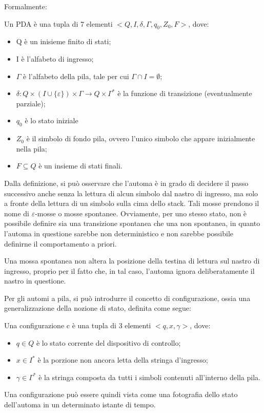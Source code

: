   \break

  \noindent
  Formalmente:
  \begin{definition}
    Un PDA è una tupla di 7 elementi \(<Q, I, \delta, \Gamma, q_0, Z_0, F>\), dove:
    \begin{itemize}
      \item Q è un inisieme finito di stati;
      \item I è l'alfabeto di ingresso;
      \item \(\Gamma\) è l'alfabeto della pila, tale per cui \(\Gamma \cap I = \emptyset\);
      \item \(\delta:Q\times (I\cup \{\varepsilon\})\times \Gamma \to Q \times \Gamma^*\) è la funzione di transizione (eventualmente parziale);
      \item \(q_0\) è lo stato iniziale
      \item \(Z_0\) è il simbolo di fondo pila, ovvero l'unico simbolo che appare inizialmente nella pila;
      \item \(F\subseteq Q\) è un insieme di stati finali.
    \end{itemize}
  \end{definition}

  Dalla definizione, si può osservare che l'automa è in grado di decidere il passo successivo anche senza la lettura di alcun simbolo dal nastro di ingresso, ma solo a fronte della lettura di un simbolo sulla cima dello stack. Tali mosse prendono il nome di \(\varepsilon\)-mosse o mosse spontanee. Ovviamente, per uno stesso stato, non è possibile definire sia una transizione spontanea che una non spontanea, in quanto l'automa in questione sarebbe non deterministico e non sarebbe possibile definirne il comportamento a priori. 

  Una mossa spontanea non altera la posizione della testina di lettura sul nastro di ingresso, proprio per il fatto che, in tal caso, l'automa ignora deliberatamente il nastro in questione.

  Per gli automi a pila, si può introdurre il concetto di configurazione, ossia una generalizzazione della nozione di stato, definita come segue:

  \begin{definition}
    Una configurazione c è una tupla di 3 elementi \(<q, x, \gamma>\), dove:
    \begin{itemize}
      \item \(q\in Q\) è lo stato corrente del dispositivo di controllo;
      \item \(x \in I^*\) è la porzione non ancora letta della stringa d'ingresso;
      \item \(\gamma \in \Gamma^*\) è la stringa composta da tutti i simboli contenuti all'interno della pila. 
    \end{itemize}
  \end{definition}
  Una configurazione può essere quindi vista come una fotografia dello stato dell'automa in un determinato istante di tempo. 

